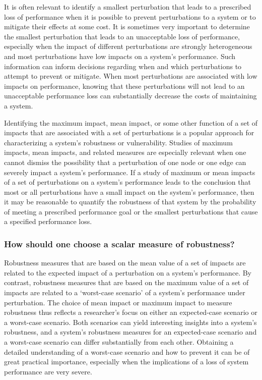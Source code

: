 \documentclass{comnet-mod}
\begin{document}
It is often relevant to identify a smallest perturbation that leads to a prescribed loss of performance  when it is possible to prevent perturbations to a system or to mitigate their effects at some cost. It is sometimes very important to determine the smallest perturbation that leads to an unacceptable loss of performance, especially when the impact of different perturbations are strongly heterogeneous and most perturbations have low impacts on a system's performance.
Such information can inform decisions regarding when and which perturbations to attempt to prevent or mitigate. When most perturbations are associated with low impacts on performance, knowing that these perturbations will not lead to an unacceptable performance loss can substantially decrease the costs of maintaining a system. 

Identifying the maximum impact, mean impact, or some other function of a set of impacts that are associated with a set of perturbations is a popular approach for characterizing a system's robustness or vulnerability. Studies of maximum impacts, mean impacts, and related measures are especially relevant when one cannot dismiss the possibility that a perturbation of one node or one edge can severely impact a system's performance. 
If a study of maximum or mean impacts of a set of perturbations on a system's performance leads to the conclusion that most or all perturbations have a small impact on the system's performance, 
then it may be reasonable to quantify the robustness of that system by the probability of meeting a prescribed performance goal or the smallest perturbations that cause a specified performance loss. 

\subsubsection{How should one choose a scalar measure of robustness?}

Robustness measures that are based on the mean value of a set of impacts are related to the expected impact of a perturbation on a system's performance. By contrast, robustness measures that are based on the maximum value of a set of impacts are related to a `worst-case scenario' of a system's performance under perturbation. The choice of mean impact or maximum impact to measure robustness thus reflects a researcher's focus on either an expected-case scenario or a worst-case scenario. Both scenarios can yield interesting insights into a system's robustness, and a system's robustness measures for an expected-case scenario and a worst-case scenario can differ substantially from each other. Obtaining a detailed understanding of a worst-case scenario and how to prevent it can be of great practical importance, especially when the implications of a loss of system performance are very severe.
\end{document}
